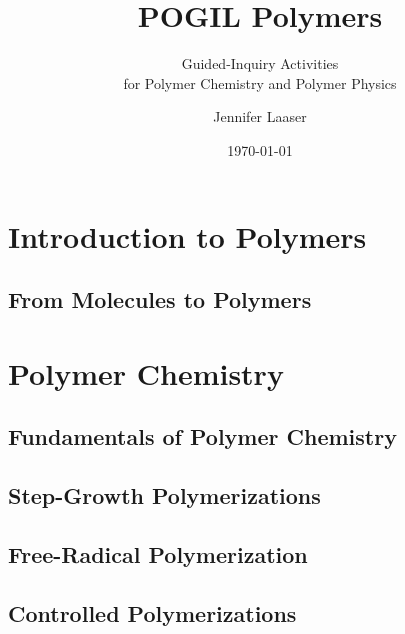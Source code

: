 \documentclass[book]{pogil}
\author{Jennifer Laaser}
\title{POGIL Polymers}
\subtitle{Guided-Inquiry Activities \\for Polymer Chemistry and Polymer Physics}
\date{\today}
\begin{document}
\frontmatter
\pagestyle{empty}
\titlepage
\clearpage

\copyrightpage
\clearpage

\tableofcontents*
\clearpage



\mainmatter
\pagestyle{fancy}

\part{Introduction to Polymers}

	\chapter{From Molecules to Polymers}
		

\part{Polymer Chemistry}

	\chapter{Fundamentals of Polymer Chemistry}

	\chapter{Step-Growth Polymerizations}
		
		
		
		

	\chapter{Free-Radical Polymerization}
		

	\chapter{Controlled Polymerizations}
\end{document}
